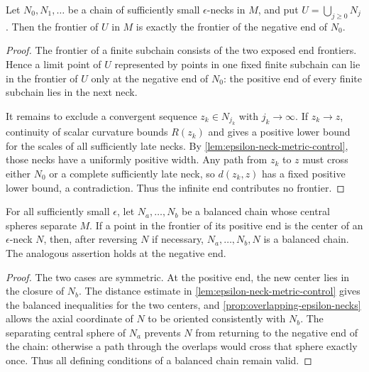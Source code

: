 \begin{lemma}
\label{lem:infinite-neck-chain-frontier}
\notready
Let $N_0,N_1,\ldots$ be a chain of sufficiently small
$\epsilon$-necks in $M$, and put $U=\bigcup_{j\ge0}N_j$.  Then the
frontier of $U$ in $M$ is exactly the frontier of the negative end of
$N_0$.
\end{lemma}

\begin{proof}
The frontier of a finite subchain consists of the two exposed end
frontiers.  Hence a limit point of $U$ represented by points in one fixed
finite subchain can lie in the frontier of $U$ only at the negative end of
$N_0$: the positive end of every finite subchain lies in the next neck.

It remains to exclude a convergent sequence $z_k\in N_{j_k}$ with
$j_k\to\infty$.  If $z_k\to z$, continuity of scalar curvature bounds
$R(z_k)$ and gives a positive lower bound for the scales of all sufficiently
late necks.  By \ref{lem:epsilon-neck-metric-control}, those necks have a
uniformly positive width.  Any path from $z_k$ to $z$ must cross either
$N_0$ or a complete sufficiently late neck, so $d(z_k,z)$ has a fixed
positive lower bound, a contradiction.  Thus the infinite end contributes
no frontier.
\end{proof}

\begin{lemma}
\label{lem:balanced-neck-chain-extension}
\notready
For all sufficiently small $\epsilon$, let
$N_a,\ldots,N_b$ be a balanced chain whose central spheres separate $M$.
If a point in the frontier of its positive end is the center of an
$\epsilon$-neck $N$, then, after reversing $N$ if necessary,
$N_a,\ldots,N_b,N$ is a balanced chain.  The analogous assertion holds at
the negative end.
\end{lemma}

\begin{proof}
The two cases are symmetric.  At the positive end, the new center lies in
the closure of $N_b$.  The distance estimate in
\ref{lem:epsilon-neck-metric-control} gives the balanced inequalities for
the two centers, and \ref{prop:overlapping-epsilon-necks} allows the axial
coordinate of $N$ to be oriented consistently with $N_b$.  The separating
central sphere of $N_a$ prevents $N$ from returning to the negative end of
the chain: otherwise a path through the overlaps would cross that sphere
exactly once.  Thus all defining conditions of a balanced chain remain
valid.
\end{proof}

